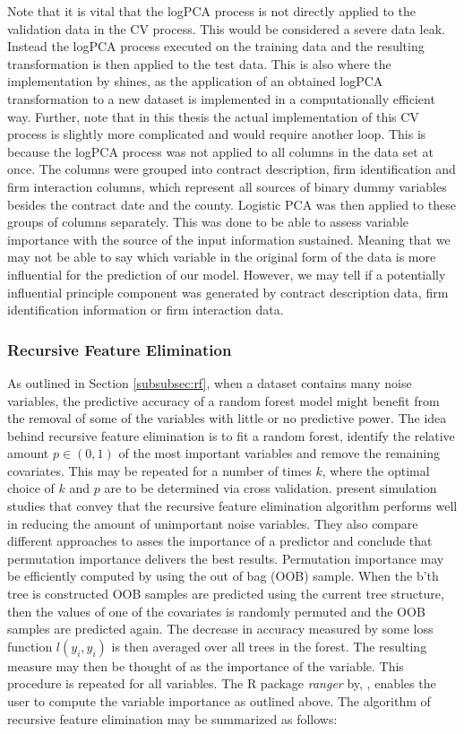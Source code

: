 \documentclass[a4paper,12pt, headsepline]{scrartcl}
\numberwithin{equation}{section}
\begin{document}
Note that it is vital that the logPCA process is not directly applied to the validation data in the CV process. This would be considered a severe data leak. Instead the logPCA process executed on the training data and the resulting transformation is then applied to the test data. This is also where the implementation by \citet{logPCA} shines, as the application of an obtained logPCA transformation to a new dataset is implemented in a computationally efficient way. Further, note that in this thesis the actual implementation of this CV process is slightly more complicated and would require another loop. This is because the logPCA process was not applied to all columns in the data set at once. The columns were grouped into contract description, firm identification and firm interaction columns, which represent all sources of binary dummy variables besides the contract date and the county. Logistic PCA was then applied to these groups of columns separately. This was done to be able to assess variable importance with the source of the input information sustained. Meaning that we may not be able to say which variable in the original form of the data is more influential for the prediction of our model. However, we may tell if a potentially influential principle component was generated by contract description data, firm identification information or firm interaction data.

\subsubsection{Recursive Feature Elimination}\label{subsubsec:rfe}
As outlined in Section \ref{subsubsec:rf}, when a dataset contains many noise variables, the predictive accuracy of a random forest model might benefit from the removal of some of the variables with little or no predictive power. The idea behind recursive feature elimination is to fit a random forest, identify the relative amount $p \in (0, 1)$ of the most important variables and remove the remaining covariates. This may be repeated for a number of times $k$, where the optimal choice of $k$ and $p$ are to be determined via cross validation. \citet{gregorutti13} present simulation studies that convey that the recursive feature elimination algorithm performs well in reducing the amount of unimportant noise variables. They also compare different approaches to asses the importance of a predictor and conclude that permutation importance delivers the best results. Permutation importance may be efficiently computed by using the out of bag  (OOB) sample. When the b'th tree is constructed OOB samples are predicted using the current tree structure, then the values of one of the covariates is randomly permuted and the OOB samples are predicted again. The decrease in accuracy measured by some loss function $l(y_i, \hat y_i)$ is then averaged over all trees in the forest. The resulting measure may then be thought of as the importance of the variable. This procedure is repeated for all variables. The R package \textit{ranger} by, \citet{ranger}, enables the user to compute the variable importance as outlined above. The algorithm of recursive feature elimination may be summarized as follows:
\end{document}
